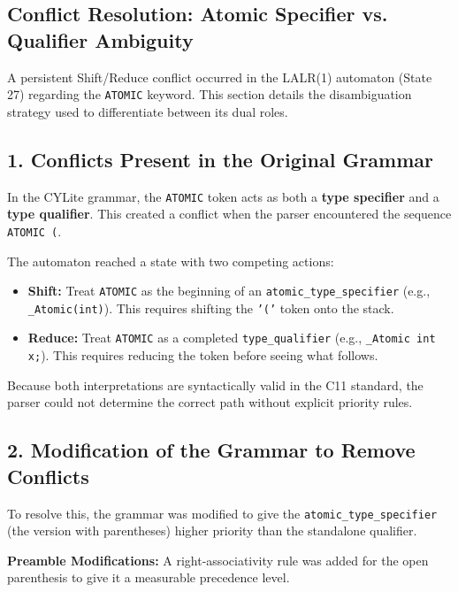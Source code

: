 \documentclass[a4paper,12pt]{article}
\begin{document}
\subsection{Conflict Resolution: Atomic Specifier vs. Qualifier Ambiguity}

A persistent Shift/Reduce conflict occurred in the LALR(1) automaton (State 27) regarding the \texttt{ATOMIC} keyword. This section details the disambiguation strategy used to differentiate between its dual roles.

\subsection*{1. Conflicts Present in the Original Grammar}
In the CYLite grammar, the \texttt{ATOMIC} token acts as both a \textbf{type specifier} and a \textbf{type qualifier}. This created a conflict when the parser encountered the sequence \texttt{ATOMIC (}.

The automaton reached a state with two competing actions:
\begin{itemize}
    \item \textbf{Shift:} Treat \texttt{ATOMIC} as the beginning of an \texttt{atomic\_type\_specifier} (e.g., \texttt{\_Atomic(int)}). This requires shifting the \texttt{'('} token onto the stack.
    \item \textbf{Reduce:} Treat \texttt{ATOMIC} as a completed \texttt{type\_qualifier} (e.g., \texttt{\_Atomic int x;}). This requires reducing the token before seeing what follows.
\end{itemize}

Because both interpretations are syntactically valid in the C11 standard, the parser could not determine the correct path without explicit priority rules.

\subsection*{2. Modification of the Grammar to Remove Conflicts}
To resolve this, the grammar was modified to give the \texttt{atomic\_type\_specifier} (the version with parentheses) higher priority than the standalone qualifier.

\textbf{Preamble Modifications:}
A right-associativity rule was added for the open parenthesis to give it a measurable precedence level.
\begin{lstlisting}[language=C]
%right '('
\end{lstlisting}
\end{document}
